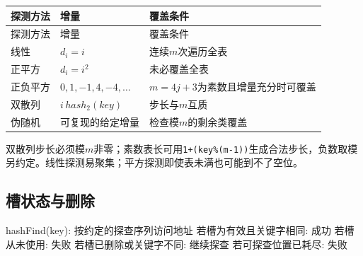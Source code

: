 \par\smallskip
{\fontsize{9.3}{12}\selectfont\setlength{\tabcolsep}{2.5pt}\setlength{\LTleft}{0pt}\setlength{\LTright}{0pt}
\begin{longtable}{@{}>{\raggedright\arraybackslash}p{}>{\raggedright\arraybackslash}p{}>{\raggedright\arraybackslash}p{}@{}}
\toprule
探测方法 & 增量 & 覆盖条件 \\

\midrule\endfirsthead\toprule
探测方法 & 增量 & 覆盖条件 \\

\midrule\endhead\bottomrule\endfoot
线性 & \(d_i=i\) & 连续\(m\)次遍历全表 \\

正平方 & \(d_i=i^2\) & 未必覆盖全表 \\

正负平方 & \(0,1,-1,4,-4,\ldots\) & \(m=4j+3\)为素数且增量充分时可覆盖 \\

双散列 & \(i\,hash_2(key)\) & 步长与\(m\)互质 \\

伪随机 & 可复现的给定增量 & 检查模\(m\)的剩余类覆盖 \\

\end{longtable}}
\par\smallskip

双散列步长必须模\(m\)非零；素数表长可用\texttt{1+\allowbreak{}(\allowbreak{}key\%(\allowbreak{}m-1)\allowbreak{})\allowbreak{}}生成合法步长，负数取模另约定。线性探测易聚集；平方探测即使表未满也可能到不了空位。

\subsection{槽状态与删除}\label{DS07-hash-state}

\par\smallskip\noindent\begin{minipage}{\linewidth}
\begin{codeblock}[language={}]
hashFind(key):
    按约定的探查序列访问地址
    若槽为有效且关键字相同: 成功
    若槽从未使用: 失败
    若槽已删除或关键字不同: 继续探查
    若可探查位置已耗尽: 失败
\end{codeblock}
\end{minipage}\par\smallskip

